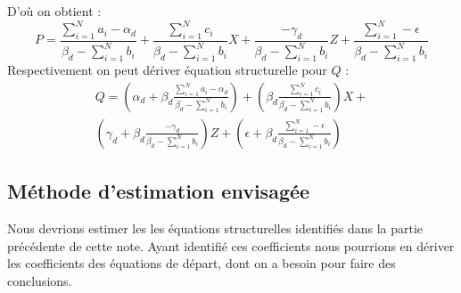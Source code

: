 \documentclass[11pt, a4paper]{article}
\begin{document}
D'où on obtient :
\begin{equation}
    P = \frac{\sum_{i = 1}^{N} a_i - \alpha_d}{\beta_d - \sum_{i = 1}^{N} b_i} + 
        \frac{\sum_{i = 1}^{N} c_i}{\beta_d - \sum_{i = 1}^{N} b_i} X +
        \frac{-\gamma_d}{\beta_d - \sum_{i = 1}^{N} b_i} Z + 
        \frac{\sum_{i = 1}^{N} - \epsilon}{\beta_d - \sum_{i = 1}^{N} b_i}
\end{equation}
Respectivement on peut dériver équation structurelle pour $Q$ :
\begin{multline}
    Q = (\alpha_d + \beta_d \frac{\sum_{i = 1}^{N} a_i - \alpha_d}{\beta_d - \sum_{i = 1}^{N} b_i}) + 
        (\beta_d \frac{\sum_{i = 1}^{N} c_i}{\beta_d - \sum_{i = 1}^{N} b_i}) X + \\
        (\gamma_d + \beta_d \frac{-\gamma_d}{\beta_d - \sum_{i = 1}^{N} b_i}) Z + 
        (\epsilon + \beta_d \frac{\sum_{i = 1}^{N} - \epsilon}{\beta_d - \sum_{i = 1}^{N} b_i})
\end{multline}

\subsection*{Méthode d'estimation envisagée}
Nous devrions estimer les les équations structurelles identifiés dans la partie précédente de cette note. 
Ayant identifié ces coefficients nous pourrions en dériver les coefficients des équations de départ, dont on a besoin pour faire des conclusions.




\end{document}
